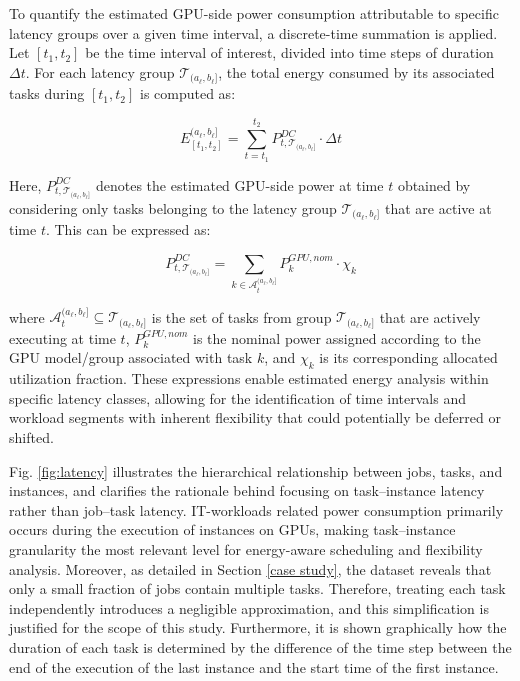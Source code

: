 \documentclass[preprint,12pt]{elsarticle}
\begin{document}
To quantify the estimated GPU-side power consumption attributable to specific latency groups over a given time interval, a discrete-time summation is applied. Let $[t_1, t_2]$ be the time interval of interest, divided into time steps of duration $\Delta t$. For each latency group $\mathcal{T}_{(a_\ell, b_\ell]}$, the total energy consumed by its associated tasks during $[t_1, t_2]$ is computed as:

\begin{equation}
E^{(a_\ell, b_\ell]}_{[t_1, t_2]} = \sum_{t = t_1}^{t_2} P^{DC}_{t, \mathcal{T}_{(a_\ell, b_\ell]}} \cdot \Delta t
\label{eq:energy_group}
\end{equation}

Here, $P^{DC}_{t, \mathcal{T}_{(a_\ell, b_\ell]}}$ denotes the estimated GPU-side power at time $t$ obtained by considering only tasks belonging to the latency group $\mathcal{T}_{(a_\ell, b_\ell]}$ that are active at time $t$. This can be expressed as:

\begin{equation}
P^{DC}_{t, \mathcal{T}_{(a_\ell, b_\ell]}} = \sum_{k \in \mathcal{A}_{t}^{(a_\ell, b_\ell]}} P^{GPU, nom}_k \cdot \chi_k
\label{eq:power_group}
\end{equation}

where $\mathcal{A}_{t}^{(a_\ell, b_\ell]} \subseteq \mathcal{T}_{(a_\ell, b_\ell]}$ is the set of tasks from group $\mathcal{T}_{(a_\ell, b_\ell]}$ that are actively executing at time $t$, $P^{GPU, nom}_k$ is the nominal power assigned according to the GPU model/group associated with task $k$, and $\chi_k$ is its corresponding allocated utilization fraction. These expressions enable estimated energy analysis within specific latency classes, allowing for the identification of time intervals and workload segments with inherent flexibility that could potentially be deferred or shifted. 

Fig. \ref{fig:latency} illustrates the hierarchical relationship between jobs, tasks, and instances, and clarifies the rationale behind focusing on task–instance latency rather than job–task latency. IT-workloads related power consumption primarily occurs during the execution of instances on GPUs, making task–instance granularity the most relevant level for energy-aware scheduling and flexibility analysis. Moreover, as detailed in Section \ref{case study}, the dataset reveals that only a small fraction of jobs contain multiple tasks. Therefore, treating each task independently introduces a negligible approximation, and this simplification is justified for the scope of this study. Furthermore, it is shown graphically how the duration of each task is determined by the difference of the time step between the end of the execution of the last instance and the start time of the first instance. 
\end{document}
